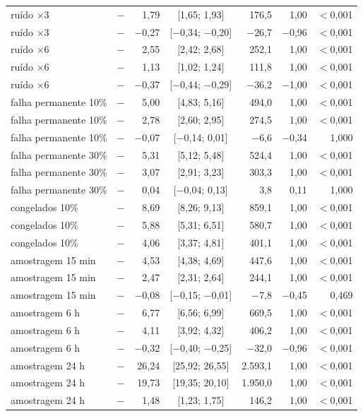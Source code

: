 \begin{tabular}{@{}llrcrrr@{}}
ruído $\times$3 & \polC{} $-$ \polA{} & 1,79 & [1,65; 1,93] & 176,5 & 1,00 & $<$0,001 \\
ruído $\times$3 & \polD{} $-$ \polA{} & $-$0,27 & [$-$0,34; $-$0,20] & $-$26,7 & $-$0,96 & $<$0,001 \\
ruído $\times$6 & \polBOR{} $-$ \polA{} & 2,55 & [2,42; 2,68] & 252,1 & 1,00 & $<$0,001 \\
ruído $\times$6 & \polC{} $-$ \polA{} & 1,13 & [1,02; 1,24] & 111,8 & 1,00 & $<$0,001 \\
ruído $\times$6 & \polD{} $-$ \polA{} & $-$0,37 & [$-$0,44; $-$0,29] & $-$36,2 & $-$1,00 & $<$0,001 \\
falha permanente 10\% & \polBOR{} $-$ \polA{} & 5,00 & [4,83; 5,16] & 494,0 & 1,00 & $<$0,001 \\
falha permanente 10\% & \polC{} $-$ \polA{} & 2,78 & [2,60; 2,95] & 274,5 & 1,00 & $<$0,001 \\
falha permanente 10\% & \polD{} $-$ \polA{} & $-$0,07 & [$-$0,14; 0,01] & $-$6,6 & $-$0,34 & 1,000 \\
falha permanente 30\% & \polBOR{} $-$ \polA{} & 5,31 & [5,12; 5,48] & 524,4 & 1,00 & $<$0,001 \\
falha permanente 30\% & \polC{} $-$ \polA{} & 3,07 & [2,91; 3,23] & 303,3 & 1,00 & $<$0,001 \\
falha permanente 30\% & \polD{} $-$ \polA{} & 0,04 & [$-$0,04; 0,13] & 3,8 & 0,11 & 1,000 \\
congelados 10\% & \polBOR{} $-$ \polA{} & 8,69 & [8,26; 9,13] & 859,1 & 1,00 & $<$0,001 \\
congelados 10\% & \polC{} $-$ \polA{} & 5,88 & [5,31; 6,51] & 580,7 & 1,00 & $<$0,001 \\
congelados 10\% & \polD{} $-$ \polA{} & 4,06 & [3,37; 4,81] & 401,1 & 1,00 & $<$0,001 \\
amostragem 15 min & \polBOR{} $-$ \polA{} & 4,53 & [4,38; 4,69] & 447,6 & 1,00 & $<$0,001 \\
amostragem 15 min & \polC{} $-$ \polA{} & 2,47 & [2,31; 2,64] & 244,1 & 1,00 & $<$0,001 \\
amostragem 15 min & \polD{} $-$ \polA{} & $-$0,08 & [$-$0,15; $-$0,01] & $-$7,8 & $-$0,45 & 0,469 \\
amostragem 6 h & \polBOR{} $-$ \polA{} & 6,77 & [6,56; 6,99] & 669,5 & 1,00 & $<$0,001 \\
amostragem 6 h & \polC{} $-$ \polA{} & 4,11 & [3,92; 4,32] & 406,2 & 1,00 & $<$0,001 \\
amostragem 6 h & \polD{} $-$ \polA{} & $-$0,32 & [$-$0,40; $-$0,25] & $-$32,0 & $-$0,96 & $<$0,001 \\
amostragem 24 h & \polBOR{} $-$ \polA{} & 26,24 & [25,92; 26,55] & 2.593,1 & 1,00 & $<$0,001 \\
amostragem 24 h & \polC{} $-$ \polA{} & 19,73 & [19,35; 20,10] & 1.950,0 & 1,00 & $<$0,001 \\
amostragem 24 h & \polD{} $-$ \polA{} & 1,48 & [1,23; 1,75] & 146,2 & 1,00 & $<$0,001 \\
\bottomrule
\end{tabular}
